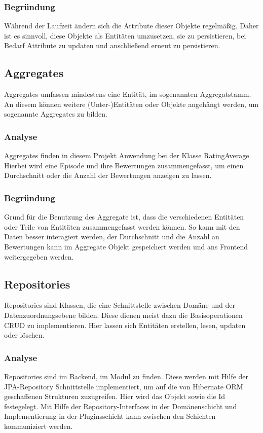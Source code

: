         \subsubsection{Begründung}
         Während der Laufzeit ändern sich die Attribute dieser Objekte regelmäßig. Daher ist es sinnvoll, diese Objekte als Entitäten umzusetzen, sie zu persistieren, bei Bedarf Attribute zu updaten und anschließend erneut zu persistieren.

    \subsection{Aggregates} \label{1.aggregate}
    Aggregates umfassen mindestens eine Entität, im sogenannten Aggregatstamm. An diesem können weitere (Unter-)Entitäten oder Objekte angehängt werden, um sogenannte Aggregates zu bilden.

        \subsubsection{Analyse}
        Aggregates finden in diesem Projekt Anwendung bei der Klasse RatingAverage. Hierbei wird eine Episode und ihre Bewertungen zusammengefasst, um einen Durchschnitt oder die Anzahl der Bewertungen anzeigen zu lassen.
        
        \subsubsection{Begründung}
        Grund für die Benutzung des Aggregate ist, dass die verschiedenen Entitäten oder Teile von Entitäten zusammengefasst werden können. So kann mit den Daten besser interagiert werden, der Durchschnitt und die Anzahl an Bewertungen kann im Aggregate Objekt gespeichert werden und ans Frontend weitergegeben werden.

    \subsection{Repositories} \label{1.repo}
    Repositories sind Klassen, die eine Schnittstelle zwischen Domäne und der Datenzuordnungsebene bilden. Diese dienen meist dazu die Basisoperationen CRUD zu implementieren. Hier lassen sich Entitäten erstellen, lesen, updaten oder löschen.
    
        \subsubsection{Analyse}
        Repositories sind im Backend, im Modul  zu finden. Diese werden mit Hilfe der JPA-Repository Schnittstelle implementiert, um auf die von Hibernate ORM geschaffenen Strukturen zuzugreifen. Hier wird das Objekt sowie die Id festegelegt. Mit Hilfe der Repository-Interfaces in der Domänenschicht und Implementierung in der Pluginsschicht kann zwischen den Schichten kommuniziert werden.

